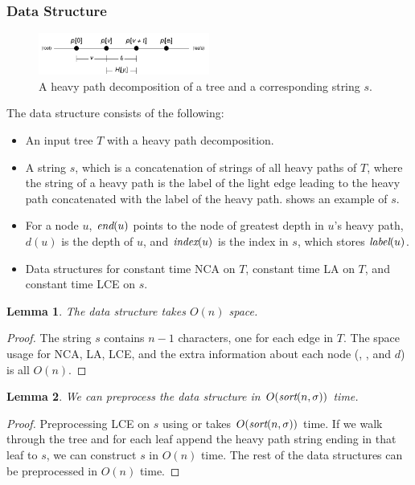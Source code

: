 \documentclass[a4]{article}
\newcommand*{\pref}{\prettyref}
\newtheorem{lemma}{Lemma}
\begin{document}
\subsubsection{Data Structure}

\begin{figure}[tp]
    \begin{center}
        \includegraphics[width=0.5\textwidth,page=4]{tree-fingerprint.pdf}
    \end{center}
    \caption{\label{fig:tree-heavy-ds}A heavy path decomposition of a tree and a corresponding  string $s$.}
\end{figure}

The  data structure consists of the following:
\begin{itemize}
\item An input tree $T$ with a heavy path decomposition.
\item A string $s$, which is a concatenation of strings of all heavy paths of $T$, where the string of a heavy path is the label of the light edge leading to the heavy path concatenated with the label of the heavy path. \pref{fig:tree-heavy-ds} shows an example of $s$.
\item For a node $u$, $\textit{end}(u)$ points to the node of greatest depth in $u$'s heavy path, $d(u)$ is the depth of $u$, and $\textit{index}(u)$ is the index in $s$, which stores $\textit{label}(u)$.
\item Data structures for constant time NCA on $T$, constant time LA on $T$, and constant time LCE on $s$.
\end{itemize}

\begin{lemma}
The  data structure takes $O(n)$ space.
\end{lemma}
\begin{proof}
The string $s$ contains $n-1$ characters, one for each edge in $T$. The space usage for NCA, LA, LCE, and the extra information about each node (\zend, \zindex, and $d$) is all $O(n)$.
\end{proof}

\begin{lemma}
We can preprocess the  data structure in $O(\textit{sort}(n,\sigma))$ time.
\end{lemma}
\begin{proof}
Preprocessing LCE on $s$ using  or  takes $O(\textit{sort}(n,\sigma))$ time. If we walk through the tree and for each leaf append the heavy path string ending in that leaf to $s$, we can construct $s$ in $O(n)$ time. The rest of the data structures can be preprocessed in $O(n)$ time.
\end{proof}
\end{document}
